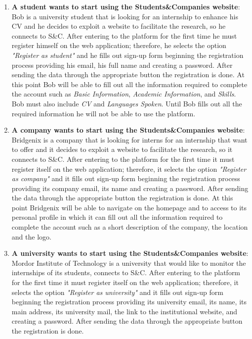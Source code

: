         \begin{enumerate}
            
            \item \textbf{A student wants to start using the Students\&Companies website}:
            \\Bob is a university student that is looking for an internship to enhance his CV and he decides to exploit a website to facilitate the research, so he connects to S\&C. After entering to the platform for the first time he must register himself on the web application; therefore, he selects the option \textit{"Register as student"} and he fills out sign-up form beginning the registration process providing his email, his full name and creating a password. After sending the data through the appropriate button the registration is done. At this point Bob will be able to fill out all the information required to complete the account such as \textit{Basic Information}, \textit{Academic Information}, and \textit{Skills}. Bob must also include \textit{CV} and \textit{Languages Spoken}. Until Bob fills out all the required information he will not be able to use the platform.

            \item \textbf{A company wants to start using the Students\&Companies website}:
            \\Bridgenix is a company that is looking for interns for an internship that want to offer and it decides to exploit a website to facilitate the research, so it connects to S\&C. After entering to the platform for the first time it must register itself on the web application; therefore, it selects the option \textit{"Register as company"} and it fills out sign-up form beginning the registration process providing its company email, its name and creating a password. After sending the data through the appropriate button the registration is done. At this point Bridgenix will be able to navigate on the homepage and to access to its personal profile in which it can fill out all the information required to complete the account such as a short description of the company, the location and the logo.

            \item \textbf{A university wants to start using the Students\&Companies website}:
            Mordor Institute of Technology is a university that would like to monitor the internships of its students, connects to S\&C. After entering to the platform for the first time it must register itself on the web application; therefore, it selects the option \textit{"Register as university"} and it fills out sign-up form beginning the registration process providing its university email, its name, its main address, its university mail, the link to the institutional website, and creating a password. After sending the data through the appropriate button the registration is done.
         

\end{enumerate}

